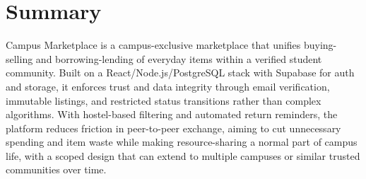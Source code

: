 \documentclass[12pt,a4paper]{article}
\begin{document}
\section{Summary}
Campus Marketplace is a campus-exclusive marketplace that unifies buying-selling and borrowing-lending of everyday items within a verified student community. Built on a React/Node.js/PostgreSQL stack with Supabase for auth and storage, it enforces trust and data integrity through email verification, immutable listings, and restricted status transitions rather than complex algorithms. With hostel-based filtering and automated return reminders, the platform reduces friction in peer-to-peer exchange, aiming to cut unnecessary spending and item waste while making resource-sharing a normal part of campus life, with a scoped design that can extend to multiple campuses or similar trusted communities over time.
\end{document}
